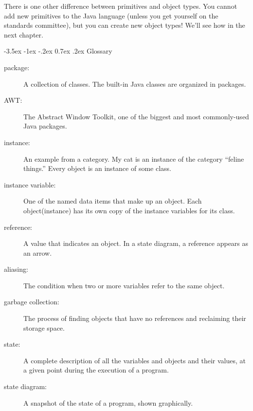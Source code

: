 \documentclass{book}
\makeatletter
\renewcommand{\section}{\@startsection 
    {section} {1} {0mm}%
    {-3.5ex \@plus -1ex \@minus -.2ex}%
    {0.7ex \@plus.2ex}%
    {\normalfont\Large\bfseries}}
\makeatother
\begin{document}
There is one other difference between primitives and object
types.  You cannot add new primitives to the Java language
(unless you get yourself on the standards committee), but
you can create new object types!  We'll see how in the next
chapter.

\section{Glossary}

\begin{description}

\item[package:]  A collection of classes.  The built-in Java
classes are organized in packages.

\item[AWT:]  The Abstract Window Toolkit, one of the biggest
and most commonly-used Java packages.

\item[instance:]  An example from a category.  My cat is an
instance of the category ``feline things.''  Every object is
an instance of some class.

\item[instance variable:]  One of the named data items that make
up an object.  Each object(instance) has its own copy of
the instance variables for its class.

\item[reference:]  A value that indicates an object.  In a
state diagram, a reference appears as an arrow.

\item[aliasing:] The condition when two or more variables refer
to the same object.

\item[garbage collection:]  The process of finding objects that
have no references and reclaiming their storage space.

\item[state:] A complete description of all the variables and
objects and their values, at a given point during the execution
of a program.

\item[state diagram:] A snapshot of the state of a program, shown
graphically.


\end{description}
\end{document}
